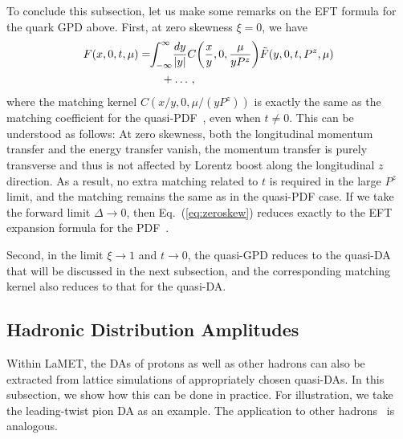 To conclude this subsection, let us make some remarks on the EFT formula for the quark GPD above. First, at zero skewness $\xi=0$, we have
\begin{align} \label{eq:zeroskew}
	F(x,0,t,\mu)&=\!\! \int_{-\infty}^\infty\! {dy\over |y|}C\!\left({x\over y}, 0, {\mu \over y{P}^z }\right)\! {\tilde F}(y,0,t,P^z,\mu)\nonumber\\
	&\qquad +\ldots\,,
\end{align}
where the matching kernel $C(x/y,0,\mu/(yP^z))$ is exactly the same as the matching coefficient for the quasi-PDF~\cite{Izubuchi:2018srq}, even when $t\neq0$. This can be understood as follows: At zero skewness, both the longitudinal momentum transfer and the energy transfer vanish, the momentum transfer is purely transverse and thus is not affected by Lorentz boost along the longitudinal $z$ direction. As a result, no extra matching related to $t$ is required in the large $P^z$ limit, and the matching remains the same as in the quasi-PDF case. If we take the forward limit $\Delta \to0$, then Eq.~(\ref{eq:zeroskew}) reduces exactly to the EFT expansion formula for the PDF~\cite{Ji:2015qla,Izubuchi:2018srq}.

Second, in the limit $\xi\to1$ and $t\to0$, the quasi-GPD reduces to the quasi-DA that will be discussed in the next subsection, and the corresponding matching kernel also reduces to that for the quasi-DA.


\subsection{Hadronic Distribution Amplitudes}
\label{sec:others-da}

Within LaMET, the DAs of protons as well as other hadrons can also be extracted from lattice simulations of appropriately chosen quasi-DAs. In this subsection, we show how this can be done in practice. For illustration, we take the leading-twist pion DA as an example. The application to other hadrons~\cite{Chen:2017gck,Wang:2019msf} is analogous.


